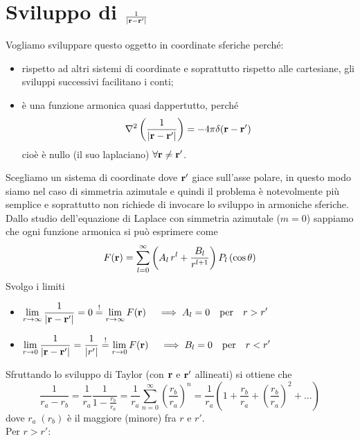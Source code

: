 \chapter{
  \texorpdfstring
  {Sviluppo di $ \frac{1}{\mathbf{ |r-r'| }}$}
  {Sviluppo di 1 su r - r'}}
Vogliamo sviluppare questo oggetto in coordinate sferiche perché:
\begin{itemize}
  \item rispetto ad altri sistemi di coordinate e soprattutto rispetto alle cartesiane, gli sviluppi successivi facilitano i conti;
  \item è una funzione armonica quasi dappertutto, perché
  \begin{equation}
    \nabla^2 \left( \frac{1}{\mathbf{ |r-r'| }} \right) = -4\pi \delta(\mathbf{ r-r' })
  \end{equation}
  cioè è nullo (il suo laplaciano) $ \forall \mathbf{ r } \not= \mathbf{ r' } $.
\end{itemize}
Scegliamo un sistema di coordinate dove $ \mathbf{ r' } $ giace sull'asse polare, in questo modo siamo nel caso di simmetria azimutale e quindi il problema 
è notevolmente più semplice e soprattutto non richiede di invocare lo sviluppo in armoniche sferiche.
Dallo studio dell'equazione di Laplace con simmetria azimutale ($ m = 0 $) sappiamo che ogni funzione armonica si può esprimere come
\begin{equation}
  F (\mathbf{ r }) = \sum_{l=0}^{\infty} \left( A_l \, r^l + \frac{B_l}{r^{l+1}} \right) P_l\left( \cos \theta \right)
\end{equation}
Svolgo i limiti
\begin{itemize}
  \item $\displaystyle \lim_{r \to \infty} \frac{1}{\mathbf{ |r-r'| }} = 0 \overset{!}{=} \lim_{r \to \infty} F(\mathbf{ r }) \quad \implies A_l = 0 \quad \text{per} \quad r>r'$
  \item $\displaystyle \lim_{r \to 0} \frac{1}{\mathbf{ |r-r'| }} = \frac{1}{|r'|} \overset{!}{=} \lim_{r \to 0} F(\mathbf{ r }) \quad  \implies B_l = 0 \quad \text{per} \quad r<r' $
\end{itemize}
Sfruttando lo sviluppo di Taylor (con $ \mathbf{ r } $ e $ \mathbf{ r' } $ allineati) si ottiene che
\begin{equation}
  \frac{1}{ r_a - r_b } = \frac{1}{r_a} \frac{1}{1- \frac{r_b}{r_a}} = \frac{1}{r_a} \sum_{n = 0}^{\infty} \left( \frac{r_b}{r_a} \right)^n =  \frac{1}{r_a} \left( 1 + \frac{r_b}{r_a} + \left( \frac{r_b}{r_a} \right)^2 + ... \right)
\end{equation}
dove $ r_a \; (r_b) $ è il maggiore (minore) fra $ r $ e $ r' $.\\
Per $ r>r' $:

